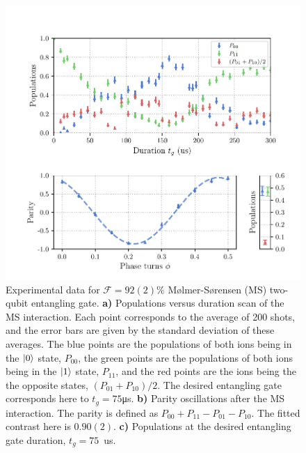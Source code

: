     \begin{figure}
        \begin{center}
        \noindent\includegraphics[width=\linewidth]{
            figures/pdf_figure/ms_gate.pdf
            }
        \end{center}
        \caption{
            Experimental data for $\mathcal{F}=92(2)$\% Mølmer-Sørensen (MS) two-qubit entangling gate.
            \textbf{a)} Populations versus duration scan of the MS interaction.
            Each point corresponds to the average of 200 shots, and the error
            bars are given by the standard deviation of these averages. The blue
            points are the populations of both ions being in the $\ket{0}$
            state, $P_{00}$, the green points are the populations of both ions
            being in the $\ket{1}$ state, $P_{11}$, and the red points are the
            ions being the the opposite states, $(P_{01}+P_{10})/2$. The desired
            entangling gate corresponds here to $t_g =  75$\unit{\us}. 
            \textbf{b)} Parity oscillations after the MS interaction. The parity
            is defined as $P_{00} + P_{11} - P_{01} - P_{10}$. The fitted
            contrast here is $0.90(2)$.
            \textbf{c)} Populations at the desired entangling gate duration, $t_g =
            75$~\unit{us}.  
            }
        \label{fig:ms_gate}
    \end{figure}

